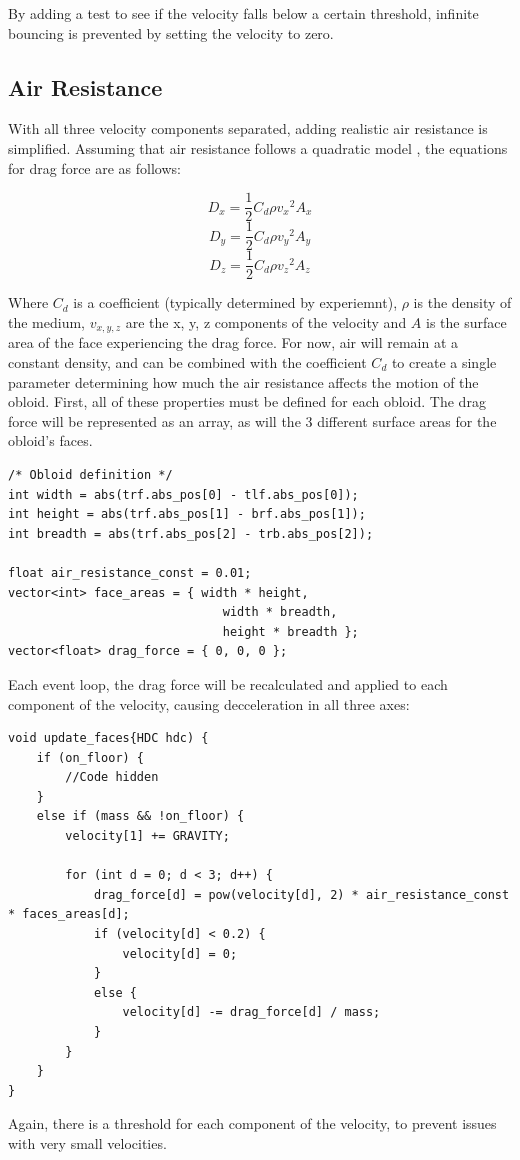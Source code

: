\documentclass{article}
\begin{document}
By adding a test to see if the velocity falls below a certain threshold, infinite bouncing is prevented by setting the velocity to zero.

\subsection{Air Resistance}
With all three velocity components separated, adding realistic air resistance is simplified. Assuming that air resistance follows a quadratic model \cite{airres}, the equations for drag force are as follows:

$$ D_x = \frac{1}{2}C_d \rho {v_x}^2 A_x  $$
$$ D_y = \frac{1}{2}C_d \rho {v_y}^2 A_y  $$
$$ D_z = \frac{1}{2}C_d \rho {v_z}^2 A_z  $$

Where $C_d$ is a coefficient (typically determined by experiemnt), $\rho$ is the density of the medium, $v_{x, y, z}$ are the x, y, z components of the velocity and $A$ is the surface area of the face experiencing the drag force. For now, air will remain at a constant density, and can be combined with the coefficient $C_d$ to create a single parameter determining how much the air resistance affects the motion of the obloid.
\newline
\newline
First, all of these properties must be defined for each obloid. The drag force will be represented as an array, as will the 3 different surface areas for the obloid's faces.
\begin{lstlisting}
/* Obloid definition */
int width = abs(trf.abs_pos[0] - tlf.abs_pos[0]);
int height = abs(trf.abs_pos[1] - brf.abs_pos[1]);
int breadth = abs(trf.abs_pos[2] - trb.abs_pos[2]);

float air_resistance_const = 0.01;
vector<int> face_areas = { width * height, 
						  	  width * breadth, 
						  	  height * breadth };
vector<float> drag_force = { 0, 0, 0 };
\end{lstlisting}
Each event loop, the drag force will be recalculated and applied to each component of the velocity, causing decceleration in all three axes:

\begin{lstlisting}
void update_faces{HDC hdc) {
	if (on_floor) {
		//Code hidden
	}
	else if (mass && !on_floor) {
		velocity[1] += GRAVITY;	
	
		for (int d = 0; d < 3; d++) {
			drag_force[d] = pow(velocity[d], 2) * air_resistance_const * faces_areas[d];
			if (velocity[d] < 0.2) {
				velocity[d] = 0;
			}
			else {
				velocity[d] -= drag_force[d] / mass;
			}
		}
	}
}
\end{lstlisting}
Again, there is a threshold for each component of the velocity, to prevent issues with very small velocities.
\newpage
\end{document}
